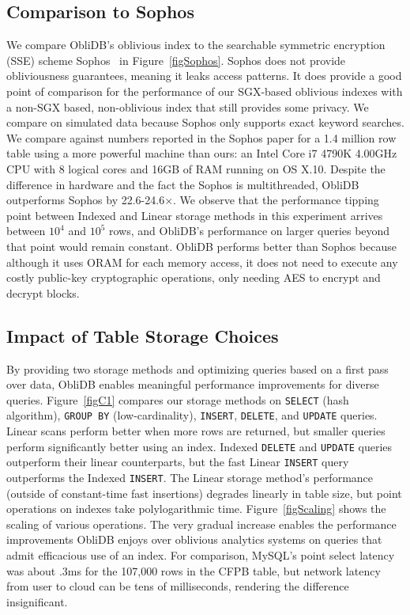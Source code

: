 \documentclass[letterpaper,twocolumn,10pt]{article}
\def\name/{ObliDB}
\begin{document}
\subsection{Comparison to Sophos}
We compare \name/'s oblivious index to the searchable symmetric encryption (SSE) scheme Sophos~\cite{Bost16} in Figure~\ref{figSophos}. Sophos does not provide obliviousness guarantees, meaning it leaks access patterns. It does provide a good point of comparison for the performance of our SGX-based oblivious indexes with a non-SGX based, non-oblivious index that still provides some privacy. We compare on simulated data because Sophos only supports exact keyword searches. We compare against numbers reported in the Sophos paper for a 1.4 million row table using a more powerful machine than ours: an Intel Core i7 4790K 4.00GHz CPU with 8 logical cores and 16GB of RAM running on OS X.10. Despite the difference in hardware and the fact the Sophos is multithreaded, \name/ outperforms Sophos by 22.6-24.6$\times$. We observe that the performance tipping point between Indexed and Linear storage methods in this experiment arrives between $10^4$ and $10^5$ rows, and \name/'s performance on larger queries beyond that point would remain constant. \name/ performs better than Sophos because although it uses ORAM for each memory access, it does not need to execute any costly public-key cryptographic operations, only needing AES to encrypt and decrypt blocks.

\subsection{Impact of Table Storage Choices}
By providing two storage methods and optimizing queries based on a first pass over data, \name/ enables meaningful performance improvements for diverse queries. Figure~\ref{figC1} compares our storage methods on \texttt{SELECT} (hash algorithm), \texttt{GROUP BY} (low-cardinality), \texttt{INSERT}, \texttt{DELETE}, and \texttt{UPDATE} queries. Linear scans perform better when more rows are returned, but smaller queries perform significantly better using an index. Indexed \texttt{DELETE} and \texttt{UPDATE} queries outperform their linear counterparts, but the fast Linear \texttt{INSERT} query outperforms the Indexed \texttt{INSERT}. The Linear storage method's performance (outside of constant-time fast insertions) degrades linearly in table size, but point operations on indexes take polylogarithmic time. Figure~\ref{figScaling} shows the scaling of various operations. The very gradual increase enables the performance improvements \name/ enjoys over oblivious analytics systems on queries that admit efficacious use of an index. For comparison, MySQL's point select latency was about .3ms for the 107,000 rows in the CFPB table, but network latency from user to cloud can be tens of milliseconds, rendering the difference insignificant.
\end{document}
